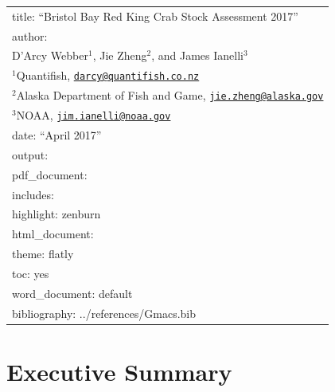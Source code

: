 \documentclass[]{article}
\title{}
\author{}
\date{}
\begin{document}
\begin{longtable}[]{@{}l@{}}
\toprule
title: ``Bristol Bay Red King Crab Stock Assessment
2017''\tabularnewline
author: \textbar{}\tabularnewline
\textbar{} D'Arcy Webber\(^1\), Jie Zheng\(^2\), and James
Ianelli\(^3\)\tabularnewline
\textbar{} \(^1\)Quantifish,
\href{mailto:darcy@quantifish.co.nz}{\nolinkurl{darcy@quantifish.co.nz}}\tabularnewline
\textbar{} \(^2\)Alaska Department of Fish and Game,
\href{mailto:jie.zheng@alaska.gov}{\nolinkurl{jie.zheng@alaska.gov}}\tabularnewline
\textbar{} \(^3\)NOAA,
\href{mailto:jim.ianelli@noaa.gov}{\nolinkurl{jim.ianelli@noaa.gov}}\tabularnewline
date: ``April 2017''\tabularnewline
output:\tabularnewline
pdf\_document:\tabularnewline
includes:\tabularnewline
highlight: zenburn\tabularnewline
html\_document:\tabularnewline
theme: flatly\tabularnewline
toc: yes\tabularnewline
word\_document: default\tabularnewline
bibliography: ../references/Gmacs.bib\tabularnewline
\bottomrule
\end{longtable}

\section{Executive Summary}\label{executive-summary}
\end{document}
